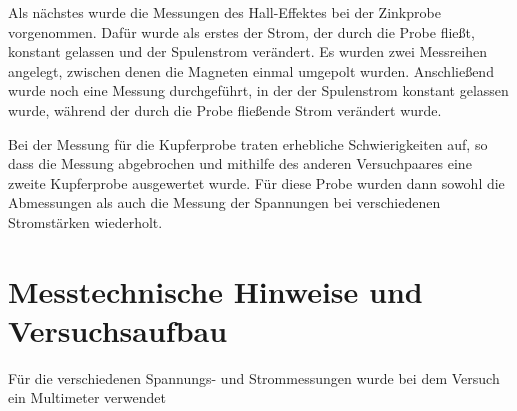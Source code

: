 Als nächstes wurde die Messungen des Hall-Effektes bei der Zinkprobe vorgenommen.
Dafür wurde als  erstes der Strom, der durch die Probe fließt, konstant gelassen
und der Spulenstrom verändert. Es wurden zwei Messreihen angelegt, zwischen denen
die Magneten einmal umgepolt wurden. Anschließend wurde noch eine Messung durchgeführt,
in der der Spulenstrom konstant gelassen wurde, während der durch die Probe fließende
Strom verändert wurde.

Bei der Messung für die Kupferprobe traten erhebliche Schwierigkeiten auf, so dass
die Messung abgebrochen und mithilfe des anderen Versuchpaares eine zweite
Kupferprobe ausgewertet wurde. Für diese Probe wurden dann sowohl die Abmessungen
als auch die Messung der Spannungen bei verschiedenen Stromstärken wiederholt.

\section{Messtechnische Hinweise und Versuchsaufbau}

Für die verschiedenen Spannungs- und Strommessungen wurde bei dem Versuch ein
Multimeter verwendet




